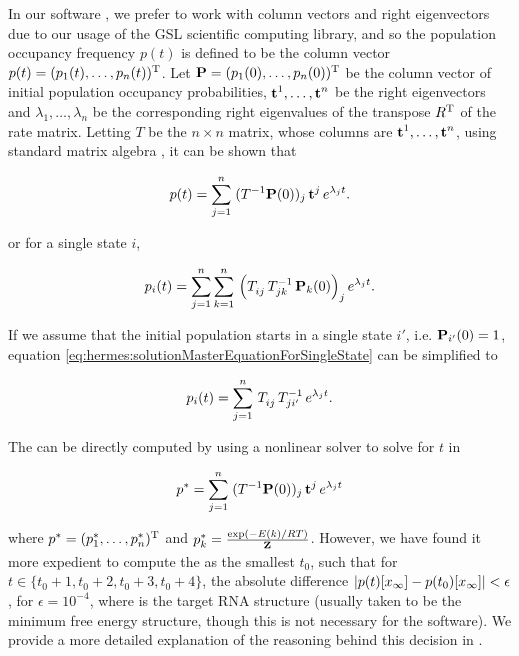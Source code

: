 In our software \hermes, we prefer to work with column vectors and
right eigenvectors due to our usage of the GSL scientific computing library,
and so the population occupancy frequency
$p(t)$ is defined to be the column vector
$p(t)=(p_1(t),\dots,p_n(t))^{\text T}$. Let
$\mbox{\bf P} = (p_1(0),\dots,p_n(0))^{\text T}$ be the column vector of initial
population occupancy probabilities,
$\mbox{\bf t}^1,\dots,\mbox{\bf t}^n$ be the right eigenvectors and
$\lambda_1,\dots,\lambda_n$ be the corresponding right eigenvalues of the
transpose $R^{\text T}$ of the rate matrix.
Letting $T$ be the $n\times n$ matrix, whose columns are
$\mbox{\bf t}^1,\dots,\mbox{\bf t}^n$, using standard matrix algebra
\citep{matrixtheory}, it can be shown that

\begin{align}
\label{eq:hermes:solutionMasterEquation}
p(t) = \sum_{j=1}^n\; (T^{-1}
\mathbbP(0))_j\, \mathbbt^j\, e^{\lambda_j t}.
\end{align}

or for a single state $i$,

\begin{align}
\label{eq:hermes:solutionMasterEquationForSingleState}
p_i(t) = \sum_{j=1}^n \sum_{k=1}^n\, \left(
T_{ij}^{\vphantom{-1}}\, T_{jk}^{-1}\, \mathbbP_k(0)
\right)_j e^{\lambda_j t}.
\end{align}

If we assume that the initial population starts in a single state $i'$,
i.e. $\mbox{\bf P}_{i'}(0) = 1$, equation
\ref{eq:hermes:solutionMasterEquationForSingleState} can be simplified to

\begin{align}
\label{eq:hermes:solutionMasterEquationForSingleStateFixedStartPop}
p_i(t) = \sum_{j=1}^n\, T_{ij}^{\vphantom{-1}}\, T_{ji'}^{-1}\, e^{\lambda_j t}.
\end{align}

The {\em \eqt} can be directly computed by using a
nonlinear solver to solve for $t$ in

\begin{align}
\label{eq:hermes:solutionEquilibriumTime}
\pSt = \sum_{j=1}^n\; (T^{-1}
\mathbbP(0))_j\, \mathbbt^j\, e^{\lambda_j t}
\end{align}

where $p^*=(p^*_1,\dots,p^*_n)^{\text T}$ and $p^*_k = \frac{\exp(-E(k)/RT)}{{\bf Z}^{}_{}}$.
However, we have found it more
expedient to compute the {\em \eqt} as the smallest $t_0$,
such that for $t \in \{t_0+1,t_0+2,t_0+3,t_0+4\}$, the absolute difference
$|p(t)[x_\infty] - p(t_0)[x_\infty]| < \epsilon$, for $\epsilon =
10^{-4}$, where \xEnd is the target RNA structure (usually taken
to be the minimum free energy structure, though this is not necessary for
the software). We provide a more detailed explanation of the reasoning behind
this decision in .

